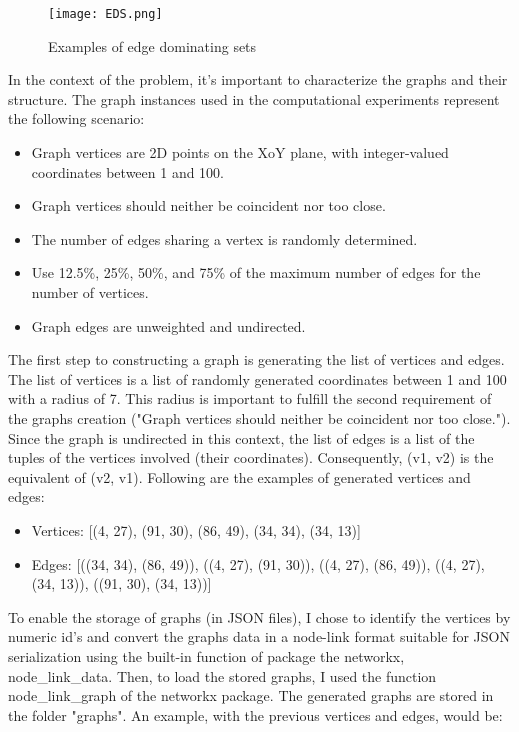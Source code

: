 \documentclass[...]{revdetua}
\begin{document}
\begin{figure}[H]
\centering
\texttt{[image: EDS.png]}
\label{fig:EDS}
\caption{Examples of edge dominating sets}
\end{figure}


In the context of the problem, it's important to characterize the graphs and their structure. The graph instances used in the computational experiments represent the following scenario:
\begin{itemize}
\item Graph vertices are 2D points on the XoY plane, with integer-valued coordinates between 1 and 100.
\item Graph vertices should neither be coincident nor too close.
\item The number of edges sharing a vertex is randomly determined.
\item Use 12.5\%, 25\%, 50\%, and 75\% of the maximum number of edges for the number of vertices.
\item Graph edges are unweighted and undirected.
\end{itemize}


The first step to constructing a graph is generating the list of vertices and edges. The list of vertices is a list of randomly generated coordinates between 1 and 100 with a radius of 7. This radius is important to fulfill the second requirement of the graphs creation ("Graph vertices should neither be coincident nor too close."). Since the graph is undirected in this context, the list of edges is a list of the tuples of the vertices involved  (their coordinates). Consequently, (v1, v2) is the equivalent of (v2, v1). Following are the examples of generated vertices and edges:

\begin{itemize}
\item Vertices: [(4, 27), (91, 30), (86, 49), (34, 34), (34, 13)]
\item Edges: [((34, 34), (86, 49)), ((4, 27), (91, 30)), ((4, 27), (86, 49)), ((4, 27), (34, 13)), ((91, 30), (34, 13))]
\end{itemize}

To enable the storage of graphs (in JSON files), I chose to identify the vertices by numeric id's and convert the graphs data in a node-link format suitable for JSON serialization using the built-in function of package the networkx, node\_link\_data. Then, to load the stored graphs, I used the function node\_link\_graph of the networkx package. The generated graphs are stored in the folder "graphs". An example, with the previous vertices and edges, would be:
\end{document}
